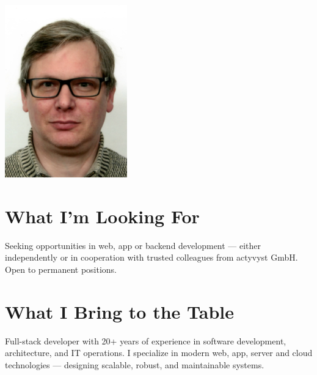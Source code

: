\documentclass[a4paper,10pt]{article}
\begin{document}
\begin{minipage}[c]{0.25\textwidth}
  \includegraphics[width=\textwidth]{assets/sascha-rose.png}
\end{minipage}

\vspace{1.5em}
\section*{What I'm Looking For}
Seeking opportunities in web, app or backend development — either independently
or in cooperation with trusted colleagues from actyvyst GmbH.
Open to permanent positions.

\vspace{1.5em}
\section*{What I Bring to the Table}
Full-stack developer with 20+ years of experience in software development,
architecture, and IT operations.
I specialize in modern web, app, server and cloud technologies — designing
scalable, robust, and maintainable systems.
\end{document}
